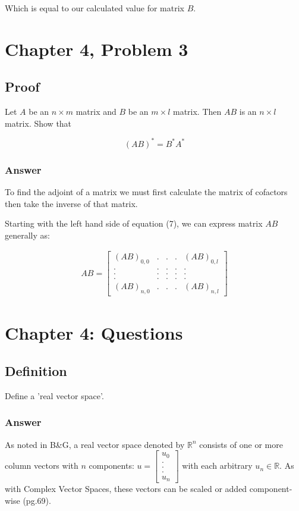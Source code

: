 \documentclass{article}
\begin{document}
		Which is equal to our calculated value for matrix $B$.
		
	\section{Chapter 4, Problem 3}
		\subsection{Proof}
		Let $A$ be an $n\times m$ matrix and $B$ be an $m\times l$ matrix.  Then $AB$ is an $n\times l$ matrix.  Show that 
		
		\begin{equation}
			(AB)^*=B^*A^*
		\end{equation}
		
		\subsubsection{Answer}
		
		To find the adjoint of a matrix we must first calculate the matrix of cofactors then take the inverse of that matrix.
		
		Starting with the left hand side of equation (7), we can express matrix $AB$ generally as:
		
		\begin{align*}AB =
			\begin{bmatrix}
			(AB)_{0,0}&.&.&.&(AB)_{0,l}\\
			.&.&.&.&.\\
			.&.&.&.&.\\
			.&.&.&.&.\\
			(AB)_{n,0}&.&.&.&(AB)_{n,l}
			\end{bmatrix}
		\end{align*}
		
	\section{Chapter 4: Questions}
		\subsection{Definition}
		Define a 'real vector space'.
		
		\subsubsection{Answer}
		As noted in B\&G, a real vector space denoted by $\mathbb{R}^{n}$ consists of one or more column vectors with $n$ components: $u=\begin{bmatrix}
		u_{0}\\
		.\\
		.\\
		.\\
		u_{n}
		\end{bmatrix}$ with each arbitrary $u_{n}\in\mathbb{R}$.  
		As with Complex Vector Spaces, these vectors can be scaled or added component-wise \cite{BG}(pg.69).  
		
\end{document}
